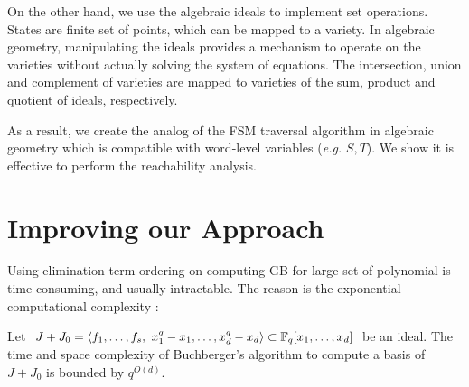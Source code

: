 \begin{figure}[H]
\end{figure}

On the other hand, we use the algebraic ideals to implement set operations. States are finite set of points,
which can be mapped to a variety.
In algebraic geometry, manipulating the ideals provides a mechanism to 
operate on the varieties without actually solving the system of equations. The intersection, union and 
complement of varieties are mapped to varieties of the sum, product and quotient of ideals, respectively.

As a result, we create the analog of the FSM traversal algorithm in algebraic geometry which is 
compatible with word-level variables ({\it e.g.} $S,T$). We show it is effective to perform the 
reachability analysis.

\section{Improving our Approach}
\label{sec:improve}

Using elimination term ordering on computing GB for large set of polynomial is time-consuming, and usually 
intractable. The reason is the exponential computational complexity \cite{gao:gf-gb-ms}:
\begin{Theorem}
Let $J+J_0 = \langle f_1, \dots, f_s, ~x_1^q - x_1, \dots, x_d^q -
x_d\rangle \subset {\mathbb{F}}_{q} [x_1, \dots, x_d]$ be an ideal. The time and
space complexity of Buchberger's algorithm to compute a \Grobner
basis of $J+J_0$ is bounded by $q^{O(d)}$.
\end{Theorem}

